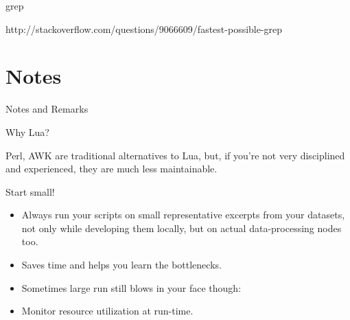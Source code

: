 \documentclass[handout]{beamer}
\begin{document}

\begin{frame}{grep}

http://stackoverflow.com/questions/9066609/fastest-possible-grep

\end{frame}


\section{Notes}


\begin{frame}
\huge Notes and Remarks
\end{frame}


\begin{frame}{Why Lua?}

Perl, AWK are traditional alternatives to Lua,
but, if you're not very disciplined and experienced,
they are much less maintainable.

\end{frame}


\begin{frame}{Start small!}

\begin{itemize}
\item Always run your scripts on small representative excerpts
      from your datasets, not only while developing them locally,
      but on actual data-processing nodes too.
\item Saves time and helps you learn the bottlenecks.
\item Sometimes large run still blows in your face though:
\item Monitor resource utilization at run-time.
\end{itemize}

\end{frame}

\end{document}

